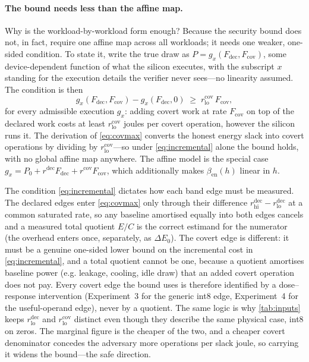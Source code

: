 \documentclass{article}
\theoremstyle{plain}
\theoremstyle{definition}
\theoremstyle{remark}
\begin{document}
\paragraph{The bound needs less than the affine map.}
\label{app:estimands}
Why is the workload-by-workload form enough? Because the security bound does
not, in fact, require one affine map across all workloads; it needs one
weaker, one-sided condition. To state it, write the true draw as
$P = g_x(F_{\mathrm{dec}}, F_{\mathrm{cov}})$, some device-dependent function
of what the silicon executes, with the subscript $x$ standing for the
execution details the verifier never sees---no linearity assumed. The
condition is then
\begin{equation}
	g_x(F_{\mathrm{dec}}, F_{\mathrm{cov}}) - g_x(F_{\mathrm{dec}}, 0)
	\;\ge\; r_{\mathrm{lo}}^{\mathrm{cov}}\,F_{\mathrm{cov}},
	\label{eq:incremental}
\end{equation}
for every admissible execution $g_x$: adding covert work at rate
$F_{\mathrm{cov}}$ on top of the declared work costs at least
$r_{\mathrm{lo}}^{\mathrm{cov}}$ joules per covert operation, however the
silicon runs it. The derivation
of \cref{eq:covmax} converts the honest energy slack into covert operations by
dividing by $r_{\mathrm{lo}}^{\mathrm{cov}}$---so under \cref{eq:incremental}
alone the bound holds, with no global affine map anywhere. The affine model is
the special case
$g_x = P_0 + r^{\mathrm{dec}}F_{\mathrm{dec}} + r^{\mathrm{cov}}F_{\mathrm{cov}}$,
which additionally makes $\beta_{\mathrm{en}}(h)$ linear in $h$.

The condition \cref{eq:incremental} dictates how each band edge must be measured. The declared edges
enter \cref{eq:covmax} only through their difference
$r_{\mathrm{hi}}^{\mathrm{dec}} - r_{\mathrm{lo}}^{\mathrm{dec}}$ at a common
saturated rate, so any baseline amortised equally into both edges cancels and
a measured total quotient $E/C$ is the correct estimand for the numerator (the
overhead enters once, separately, as $\Delta E_0$). The covert edge is
different: it must be a genuine one-sided lower bound on the incremental cost
in \cref{eq:incremental}, and a total quotient cannot be one, because a
quotient amortises baseline power (e.g. leakage, cooling, idle draw) that an
added covert operation does not pay. Every covert edge the bound uses is
therefore identified by a dose--response intervention (Experiment~3 for the
generic int8 edge, Experiment~4 for the useful-operand edge), never by a
quotient. The same logic is why \cref{tab:inputs} keeps
$r_{\mathrm{lo}}^{\mathrm{dec}}$ and $r_{\mathrm{lo}}^{\mathrm{cov}}$ distinct
even though they describe the same physical case, int8 on zeros. The marginal figure is the
cheaper of the two, and a cheaper covert denominator concedes the adversary
more operations per slack joule, so carrying it widens the bound---the safe
direction.
\end{document}
